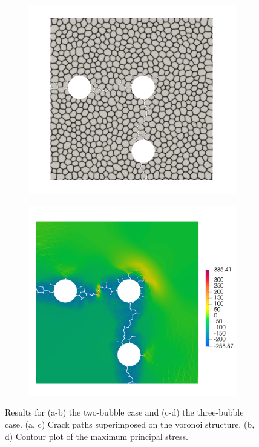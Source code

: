 \begin{figure}[htb!]
  \begin{subfigure}[t]{0.35\linewidth}
    \centering
    \includegraphics[width=\linewidth]{Chapter3/figures/three_bubbles_bnd}
    \caption{}
  \end{subfigure}
  \begin{subfigure}[t]{0.35\linewidth}
    \centering
    \includegraphics[width=\linewidth]{Chapter3/figures/three_bubbles_stress}
    \caption{}
  \end{subfigure}
  \caption[Crack propagation from multiple bubbles.]{Results for (a-b) the two-bubble case and (c-d) the three-bubble case. (a, c) Crack paths superimposed on the voronoi structure. (b, d) Contour plot of the maximum principal stress.}
  \label{fig:compare_bubble_distribution}
\end{figure}


